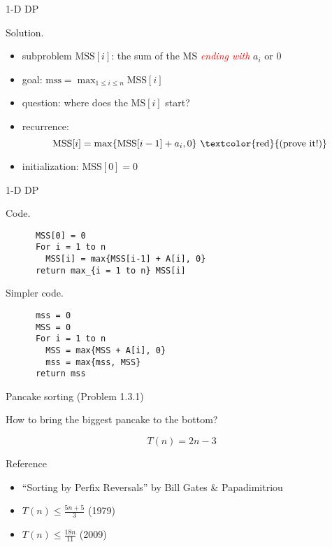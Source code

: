 \begin{frame}{1-D DP}
  \begin{block}{Solution.}
    \begin{itemize}
      \item subproblem $\text{MSS}[i]$: the sum of the MS \textcolor{red}{\it ending with} $a_{i}$ or 0
      \item goal: $\text{mss} = \max_{1 \le i \le n} \text{MSS}[i]$
      \item<2-> question: where does the $\text{MS}[i]$ start?
      \item<2-> recurrence: 
		\[ 
		  \text{MSS}[i] = \max \set{\text{MSS}[i-1] + a_{i}, 0} \text{ \textcolor{red}{(prove it!)}}
		\]
      \item<3-> initialization: $\text{MSS}[0] = 0$
    \end{itemize}

  \end{block}
\end{frame}
\begin{frame}[fragile]{1-D DP}
  \begin{block}{Code.}
    \begin{verbatim}
      MSS[0] = 0
      For i = 1 to n
        MSS[i] = max{MSS[i-1] + A[i], 0}
      return max_{i = 1 to n} MSS[i]
    \end{verbatim}
  \end{block}

  \pause

  \begin{block}{Simpler code.}
    \begin{verbatim}
      mss = 0
      MSS = 0
      For i = 1 to n
        MSS = max{MSS + A[i], 0}
        mss = max{mss, MSS}
      return mss
    \end{verbatim}
  \end{block}
\end{frame}
\begin{frame}{Pancake sorting (Problem 1.3.1)}
  \centerline{How to bring the biggest pancake to the bottom?}

  \pause
  \[
	T(n) = 2n-3
  \]

  \pause

  \begin{alertblock}{Reference}
	\begin{itemize}
	  \item ``Sorting by Perfix Reversals'' by Bill Gates \& Papadimitriou
		\pause
	  \item $T(n) \le \frac{5n+5}{3}$ (1979)
	  \item $T(n) \le \frac{18n}{11}$ (2009)
	\end{itemize}
  \end{alertblock}
\end{frame}
